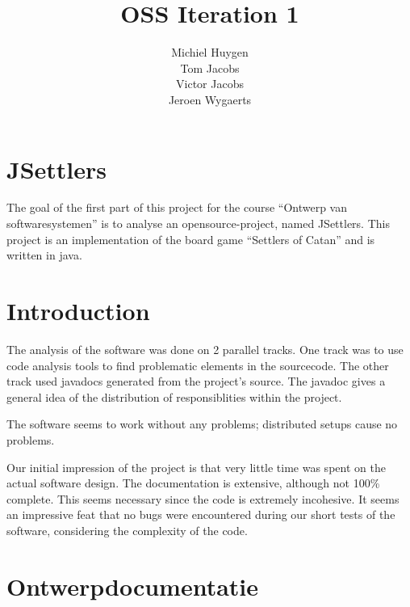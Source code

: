 \documentclass[pdftex12pt, a4paper]{article}
\begin{document}
\begin{titlepage}

\title{OSS Iteration 1}
\author{Michiel Huygen\\Tom Jacobs\\Victor Jacobs\\Jeroen Wygaerts}

\maketitle
\thispagestyle{empty}

\end{titlepage}

\newpage

\tableofcontents

\newpage


\section*{JSettlers}

The goal of the first part of this project for the course ``Ontwerp van softwaresystemen'' is to analyse an opensource-project, named JSettlers. 
This project is an implementation of the board game ``Settlers of Catan'' and is written in java.

\section{Introduction}
The analysis of the software was done on 2 parallel tracks. 
One track was to use code analysis tools to find problematic elements in the sourcecode. 
The other track used javadocs generated from the project's source. 
The javadoc gives a general idea of the distribution of responsiblities within the project.

The software seems to work without any problems; distributed setups cause no problems.

Our initial impression of the project is that very little time was spent on the actual software design. 
The documentation is extensive, although not 100\% complete. 
This seems necessary since the code is extremely incohesive. 
It seems an impressive feat that no bugs were encountered during our short tests of the software, considering the complexity of the code. 

\newpage
\section{Ontwerpdocumentatie}
\end{document}
